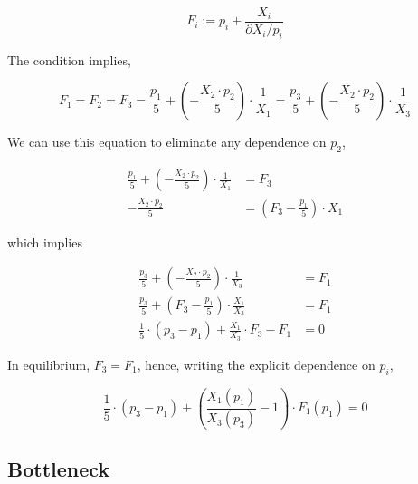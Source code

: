 \begin{equation}
  F_i := p_i +  \frac{X_i}{\partial X_i / p_i}
\end{equation}

The condition implies,

\begin{equation}
  F_1 = F_2 = F_3 = \frac{p_1}{5} + \left(- \frac{X_2 \cdot p_2}{5} \right) \cdot \frac{1}{X_1} = \frac{p_3}{5} + \left(- \frac{X_2 \cdot p_2}{5} \right) \cdot \frac{1}{X_3}
\end{equation}

We can use this equation to eliminate any dependence on $p_2$,

\begin{equation}
  \begin{split}
    \frac{p_1}{5} + \left(- \frac{X_2 \cdot p_2}{5} \right) \cdot \frac{1}{X_1} &= F_3 \\
    - \frac{X_2 \cdot p_2}{5} &= \left( F_3 - \frac{p_1}{5} \right) \cdot X_1
  \end{split}
\end{equation}

which implies

\begin{equation}
  \begin{split}
    \frac{p_3}{5} + \left(- \frac{X_2 \cdot p_2}{5} \right) \cdot \frac{1}{X_3} &= F_1 \\
    \frac{p_3}{5} + \left( F_3 - \frac{p_1}{5} \right) \cdot \frac{X_1}{X_3} &= F_1 \\
    \frac{1}{5} \cdot (p_3 - p_1) + \frac{X_1}{X_3} \cdot F_3 - F_1 &= 0
  \end{split}
\end{equation}

In equilibrium, $F_3 = F_1$, hence, writing the explicit dependence on $p_i$,

\begin{equation}
  \frac{1}{5} \cdot (p_3 - p_1) + \left( \frac{X_1(p_1)}{X_3(p_3)} - 1 \right) \cdot F_1(p_1)= 0
\end{equation}

\subsection{Bottleneck}


\vspace{0.5cm}

